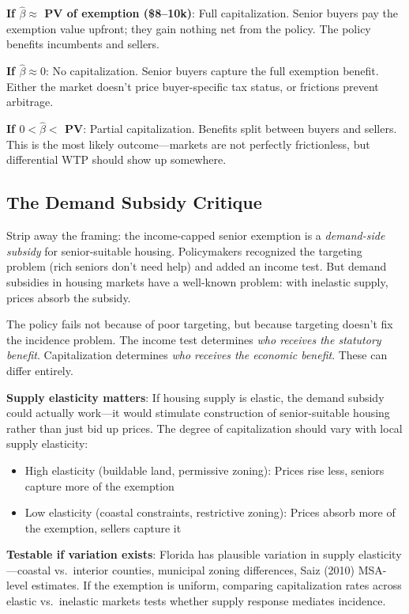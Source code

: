 \documentclass[11pt]{article}
\begin{document}
\textbf{If $\hat{\beta} \approx$ PV of exemption (\$8--10k)}: Full capitalization. Senior buyers pay the exemption value upfront; they gain nothing net from the policy. The policy benefits incumbents and sellers.

\textbf{If $\hat{\beta} \approx 0$}: No capitalization. Senior buyers capture the full exemption benefit. Either the market doesn't price buyer-specific tax status, or frictions prevent arbitrage.

\textbf{If $0 < \hat{\beta} <$ PV}: Partial capitalization. Benefits split between buyers and sellers. This is the most likely outcome---markets are not perfectly frictionless, but differential WTP should show up somewhere.

\subsection{The Demand Subsidy Critique}

Strip away the framing: the income-capped senior exemption is a \textit{demand-side subsidy} for senior-suitable housing. Policymakers recognized the targeting problem (rich seniors don't need help) and added an income test. But demand subsidies in housing markets have a well-known problem: with inelastic supply, prices absorb the subsidy.

The policy fails not because of poor targeting, but because targeting doesn't fix the incidence problem. The income test determines \textit{who receives the statutory benefit}. Capitalization determines \textit{who receives the economic benefit}. These can differ entirely.

\textbf{Supply elasticity matters}: If housing supply is elastic, the demand subsidy could actually work---it would stimulate construction of senior-suitable housing rather than just bid up prices. The degree of capitalization should vary with local supply elasticity:
\begin{itemize}
    \item High elasticity (buildable land, permissive zoning): Prices rise less, seniors capture more of the exemption
    \item Low elasticity (coastal constraints, restrictive zoning): Prices absorb more of the exemption, sellers capture it
\end{itemize}

\textbf{Testable if variation exists}: Florida has plausible variation in supply elasticity---coastal vs.\ interior counties, municipal zoning differences, Saiz (2010) MSA-level estimates. If the exemption is uniform, comparing capitalization rates across elastic vs.\ inelastic markets tests whether supply response mediates incidence.
\end{document}
